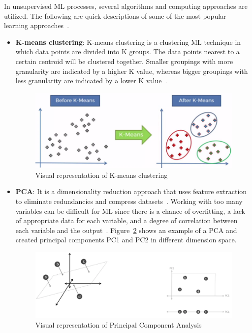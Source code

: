 In unsupervised \gls{ML} processes, several algorithms and computing approaches are utilized. The following are quick descriptions of some of the most popular learning approaches~\cite{Chugh2018TypesKnow}.
\begin{itemize}
    \item \textbf{K-means clustering}: K-means clustering is a clustering \gls{ML} technique in which data points are divided into K groups. The data points nearest to a certain centroid will be clustered together. Smaller groupings with more granularity are indicated by a higher K value, whereas bigger groupings with less granularity are indicated by a lower K value~\cite{2020WhatIBMb}.
    
    \begin{figure}[htbp]
        \centering
        \includegraphics[width=0.65\linewidth]{Chapters/Figures/k-means.png}
        \caption{Visual representation of K-means clustering~\cite{Beaumont2020ImageMedium}}
        \label{fig:k-means}
    \end{figure}
    
    \item \textbf{\gls{PCA}}: It is a dimensionality reduction approach that uses feature extraction to eliminate redundancies and compress datasets~\cite{2020WhatIBMb}. Working with too many variables can be difficult for \gls{ML} since there is a chance of overfitting, a lack of appropriate data for each variable, and a degree of correlation between each variable and the output~\cite{Chugh2018TypesKnow}. Figure~\ref{fig:pca} shows an example of a \gls{PCA} and created principal components PC1 and PC2 in different dimension space.
    
    \begin{figure}[htbp]
        \centering
        \includegraphics[width=0.85\linewidth]{Chapters/Figures/pca.png}
        \caption{Visual representation of Principal Component Analysis~\cite{Sah2020MachineTypes}}
        \label{fig:pca}
    \end{figure}
    
\end{itemize}


